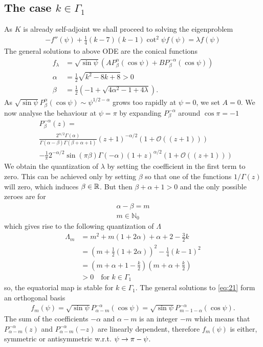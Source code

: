 \subsection*{The case $k\in\Gamma_1$}

As $K$ is already self-adjoint we shall proceed to solving the
eigenproblem
\begin{align}
  \label{eq:21}
  -f''(\psi)+\frac{1}{4}(k-7)(k-1)\cot^2\psi f(\psi)=\lambda f(\psi)
\end{align}
The general solutions to above ODE are the conical functions
\begin{align}
  \label{eq:1}
  f_\lambda&=\sqrt{\sin\psi}
  \left(AP_{\beta}^{\alpha}(\cos\psi)+BP_{\beta}^{-\alpha}(\cos\psi)\right)\\
  \alpha&=\frac{1}{2}\sqrt{k^2-8k+8}>0\\
  \beta&=\frac{1}{2}\left(-1+\sqrt{4\alpha^2-1+4\lambda}\right).
\end{align}
As $\sqrt{\sin\psi}P_\beta^{\alpha}(\cos\psi)\sim\psi^{1/2-\alpha}$
grows too rapidly at $\psi=0$, we set $A=0$. We now analyse the
behaviour at $\psi=\pi$ by expanding $P_\beta^{-\alpha}$ around
$\cos\pi=-1$
\begin{align}
  \label{eq:2}
  &P_\beta^{-\alpha}(z)=\\
  &\frac{2^{\alpha/2}\Gamma(\alpha)}{\Gamma(\alpha-\beta)\Gamma(\beta+\alpha+1)}
  (z+1)^{-\alpha/2}(1+\mathcal{O}((z+1)))\\
  &-\frac{1}{\pi}2^{-\alpha/2}\sin(\pi\beta)\Gamma(-\alpha)
  (1+z)^{\alpha/2}(1+\mathcal{O}((z+1)))
\end{align}
We obtain the quantization of $\lambda$ by setting the coefficient in
the first term to zero. This can be achieved only by setting $\beta$
so that one of the functions $1/\Gamma(z)$ will zero, which induces
$\beta\in\mathbb{R}$. But then $\beta+\alpha+1>0$ and the only possible zeroes
are for
\begin{align}
  \label{eq:3}
  \alpha-\beta=m\\
  m\in\mathbb{N}_0
\end{align}
which gives rise to the following quantization of $\Lambda$
\begin{align}
  \label{eq:6}
  \Lambda_m&=m^2+m(1+2\alpha)+\alpha+2-\frac{3}{2}k\\
  &=(m+\frac{1}{2}(1+2\alpha))^2-\frac{1}{4}(k-1)^2\\
  &=(m+\alpha+1-\frac{k}{2})(m+\alpha+\frac{k}{2})\\
  &>0\quad\text{for } k\in\Gamma_1
\end{align}
so, the equatorial map is stable for $k\in\Gamma_1$.  The general
solutions to \eqref{eq:21} form an orthogonal basis
\begin{align}
  \label{eq:11}
  f_m(\psi)=\sqrt{\sin\psi}P_{\alpha-m}^{-\alpha}(\cos\psi)=\sqrt{\sin\psi}P_{m-1-\alpha}^{-\alpha}(\cos\psi).
\end{align}
The sum of the coefficients $-\alpha$ and $\alpha-m$ is an integer
$-m$ which means that $P_{\alpha-m}^{-\alpha}(z)$ and
$P_{\alpha-m}^{-\alpha}(-z)$ are linearly dependent, therefore
$f_m(\psi)$ is either, symmetric or antisymmetric
w.r.t. $\psi\rightarrow\pi-\psi$.


